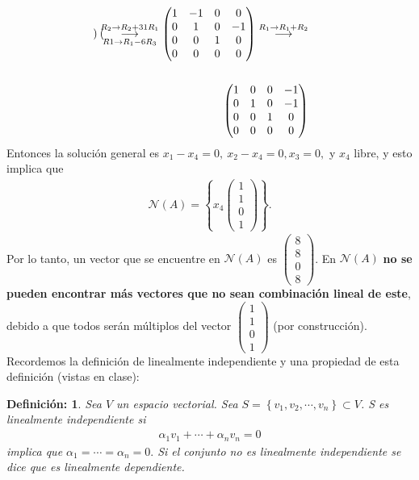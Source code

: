\documentclass[11pt,letterpaper]{article}
\newcommand{\grstep}[2][\relax]{%
   \ensuremath{\mathrel{
       {\mathop{\longrightarrow}\limits^{#2\mathstrut}_{
                                     \begin{subarray}{l} #1 \end{subarray}}}}}}
\newtheorem{thmd}{Definición:}
\begin{document}
\begin{enumerate}
\begin{align*}
\begin{pmatrix}
\end{pmatrix}%
\grstep[R1 \rightarrow R_1-6R_3]{R_2 \rightarrow R_2+31R_1}
%
\begin{pmatrix}
 1 & -1 &  0 & 0\\
 0 &  1 &  0 &-1\\
 0 &  0 &  1 & 0\\
 0 &  0 &  0 & 0
\end{pmatrix}%
\grstep[]{R_1 \rightarrow R_1+R_2}\\ \\
\begin{pmatrix}
 1 &  0 &  0 & -1\\
 0 &  1 &  0 &-1\\
 0 &  0 &  1 & 0\\
 0 &  0 &  0 & 0
\end{pmatrix}&
\end{align*}
Entonces la solución general es $x_1-x_4=0, \ x_2-x_4=0, x_3=0,$ y $x_4$ libre, y esto implica que 
\begin{align*}
\mathcal{N}(A)=\left\{x_4 \begin{pmatrix}
1\\
1\\
0\\
1
\end{pmatrix} \right\}.
\end{align*}
Por lo tanto, un vector que se encuentre en $\mathcal{N}(A)$ es $\begin{pmatrix}
8\\
8\\
0\\
8
\end{pmatrix}$. En $\mathcal{N}(A)$ \textbf{no se pueden encontrar más vectores que no sean combinación lineal de este}, debido a que todos serán múltiplos del vector $\begin{pmatrix}
1\\
1\\
0\\
1
\end{pmatrix}$ (por construcción).\\

Recordemos la definición de linealmente independiente y una propiedad de esta definición (vistas en clase):
\begin{framed}
    \begin{thmd} \label{linealemente_ind}
    Sea $V$ un espacio vectorial. Sea $S=\left\{v_1, v_2, \cdots , v_n \right\} \subset V$. S es linealmente independiente si 
    \begin{align*}
    \alpha_1v_1+\cdots+\alpha_nv_n=0
    \end{align*}
    implica que $\alpha_1=\cdots=\alpha_n=0.$ Si el conjunto no es linealmente independiente se dice que es linealmente dependiente.
    \end{thmd}
\end{framed} 


\end{enumerate}
\end{document}
